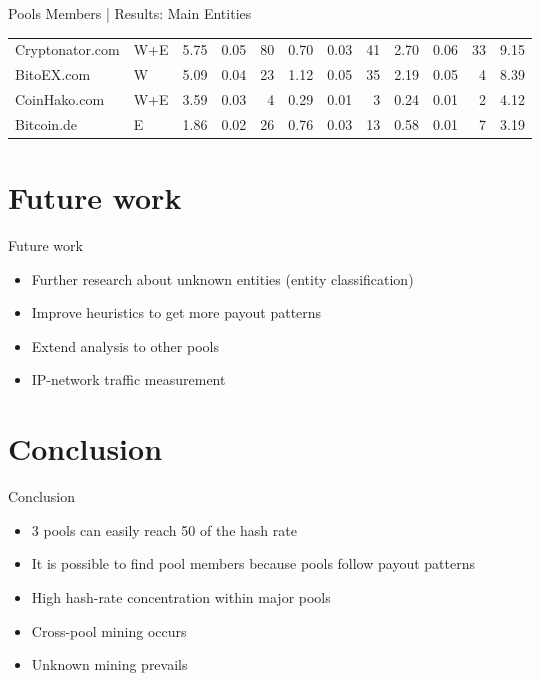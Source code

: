 \documentclass[10pt]{beamer}
\begin{document}
\begin{frame}[fragile]{Pools Members | Results: Main Entities}
\begin{table}
{\begin{tabular}{@{}llrrrrrrrrrr@{}}
            Cryptonator.com     & W+E     & 5.75    & 0.05  & 80          & 0.70    & 0.03  & 41          & 2.70    & 0.06  & 33          & 9.15      \\ 
            BitoEX.com          & W       & 5.09    & 0.04  & 23          & 1.12    & 0.05  & 35          & 2.19    & 0.05  & 4           & 8.39      \\ 
            CoinHako.com        & W+E     & 3.59    & 0.03  & 4           & 0.29    & 0.01  & 3           & 0.24    & 0.01  & 2           & 4.12      \\ 
            Bitcoin.de          & E       & 1.86    & 0.02  & 26          & 0.76    & 0.03  & 13          & 0.58    & 0.01  & 7           & 3.19      \\ \bottomrule
            \end{tabular}
        }
    \end{table} 
\end{frame}

\section{Future work} 
\begin{frame}[fragile]{Future work}
    \begin{itemize}
        \item Further research about unknown entities (entity classification)
        \item Improve heuristics to get more payout patterns
        \item Extend analysis to other pools
        \item IP-network traffic measurement
    \end{itemize}
\end{frame}

\section{Conclusion} 
\begin{frame}[fragile]{Conclusion}
    \begin{itemize}
        \item 3 pools can easily reach 50 of the hash rate
        \item It is possible to find pool members because pools follow payout patterns
        \item High hash-rate concentration within major pools
        \item Cross-pool mining occurs
        \item Unknown mining prevails
    \end{itemize}
\end{frame}
\end{document}
